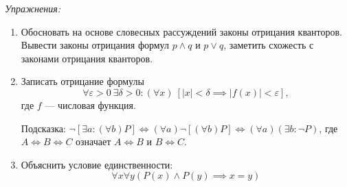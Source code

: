 \vspace{1em}
{\it Упражнения:}
\begin{enumerate}
	\item{}Обосновать на основе словесных рассуждений законы отрицания
	кванторов\label{ex:quantor_neg_def}. Вывести законы отрицания формул
	$p\land q$ и $p\lor q$, заметить схожесть с законами отрицания кванторов.
	\item{}Записать отрицание формулы
	\[
		\forall \varepsilon>0~\exists \delta>0:
		(\forall x)~[|x|<\delta\implies |f(x)|<\varepsilon],
	\]
	где $f$ --- числовая функция.

	Подсказка:
	${\lnot[\exists a:(\forall b)P]\iff(\forall a)\lnot[(\forall b)P]\iff
				(\forall a)(\exists b:\lnot P)}$,
	где $A\iff B\iff C$ означает $A\iff B$ и $B\iff C$.

	\item{}Объяснить условие единственности:
	\[
		\forall x\forall y(P(x)\land P(y)\implies x=y)
	\]
\end{enumerate}
